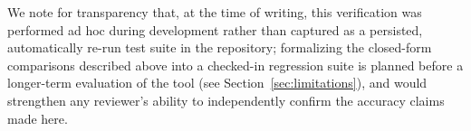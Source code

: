We note for transparency that, at the time of writing, this verification was performed
ad hoc during development rather than captured as a persisted, automatically re-run test
suite in the repository; formalizing the closed-form comparisons described above into a
checked-in regression suite is planned before a longer-term evaluation of the tool (see
Section~\ref{sec:limitations}), and would strengthen any reviewer's ability to independently
confirm the accuracy claims made here.

